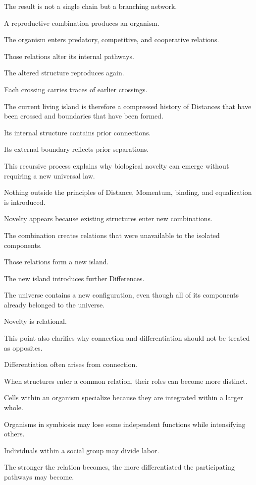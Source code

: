 The result is not a single chain but a branching network.

A reproductive combination produces an organism.

The organism enters predatory, competitive, and cooperative relations.

Those relations alter its internal pathways.

The altered structure reproduces again.

Each crossing carries traces of earlier crossings.

The current living island is therefore a compressed history of Distances that have been crossed and boundaries that have been formed.

Its internal structure contains prior connections.

Its external boundary reflects prior separations.

This recursive process explains why biological novelty can emerge without requiring a new universal law.

Nothing outside the principles of Distance, Momentum, binding, and equalization is introduced.

Novelty appears because existing structures enter new combinations.

The combination creates relations that were unavailable to the isolated components.

Those relations form a new island.

The new island introduces further Differences.

The universe contains a new configuration, even though all of its components already belonged to the universe.

Novelty is relational.

This point also clarifies why connection and differentiation should not be treated as opposites.

Differentiation often arises from connection.

When structures enter a common relation, their roles can become more distinct.

Cells within an organism specialize because they are integrated within a larger whole.

Organisms in symbiosis may lose some independent functions while intensifying others.

Individuals within a social group may divide labor.

The stronger the relation becomes, the more differentiated the participating pathways may become.


